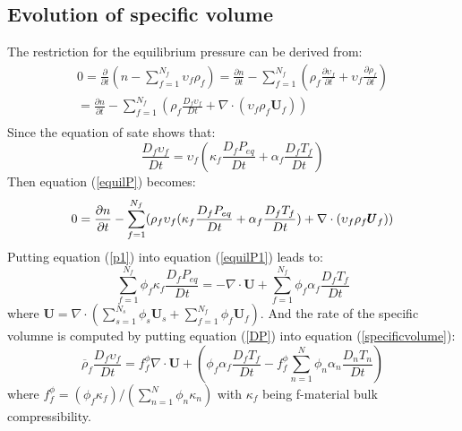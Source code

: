 \documentclass[preprint,12pt]{elsarticle}
\begin{document}
\subsection{\textsf{Evolution of specific volume}}
%
%
The restriction for the equilibrium pressure can be derived from:
%
%
\begin{equation}
\begin{gathered}
    0 = \frac{\partial }{\partial t} (n - \sum_{f=1}^{N_f} \upsilon_f \rho_f) =  \frac{\partial n}{\partial t} - \sum_{f=1}^{N_f} (\rho_f\frac{\partial \upsilon_f}{\partial t} + \upsilon_f \frac{\partial \rho_f}{\partial t}) \\
= \frac{\partial n}{\partial t} - \sum_{f=1}^{N_f} (\rho_f\frac{D_f \upsilon_f}{Dt} + \nabla \cdot (\upsilon_f \rho_f \pmb{U}_f))\\
\label{equilP}
\end{gathered}
\end{equation}
%
%
Since the equation of sate shows that:
%
%
\begin{equation}
    \frac{D_f \upsilon_f}{Dt} = \upsilon_f (\kappa_f \frac{D_f P_{eq}}{Dt} + \alpha_f  \frac{D_f T_f}{Dt})
\label{specificvolume}
\end{equation}
%
%
Then equation (\ref{equilP}) becomes:
%
%
\begin{equation} 
\label{equilP1}
    0= \frac{\partial n}{\partial t} - \sum_{f=1}^{N_f} (\rho_f \upsilon_f (\kappa_f \frac{D_f P_{eq}}{Dt} + \alpha_f  \frac{D_f T_f}{Dt}) + \nabla \cdot (\upsilon_f \rho_f \pmb{U}_f))\\
\end{equation}
%
%
Putting equation (\ref{p1}) into equation (\ref{equilP1}) leads to:
%
%
\begin{equation} 
    \sum_{f=1}^{N_f}  \phi_f \kappa_f \frac{D_f P_{eq}}{Dt} = - \nabla \cdot \pmb{U} + \sum_{f=1}^{N_f} \phi_f \alpha_f \frac{D_f T_f}{Dt}
   \label{DP}
\end{equation}
%
%
where $\pmb{U} = \nabla \cdot (\sum_{s=1}^{N_s} \phi_s \pmb{U}_s + \sum_{f=1}^{N_f}  \phi_f \pmb{U}_f)$. And the rate of the specific volumne is computed by putting equation (\ref{DP}) into equation (\ref{specificvolume}):
\begin{equation}
\overline{\rho}_f \frac{D_f \upsilon_f }{Dt} = f_f^{\phi} \nabla \cdot \pmb{U} + (\phi_f \alpha_f \frac{D_f T_f}{Dt} - f_f^{\phi} \sum_{n=1}^{N} \phi_n \alpha_n \frac{D_n T_n}{Dt})
\end{equation}
where $ f_f^{\phi} = (\phi_f  \kappa_f ) / (\sum_{n=1}^{N} \phi_n \kappa_n)$ with  $\kappa_f$ being f-material bulk compressibility.
\end{document}
